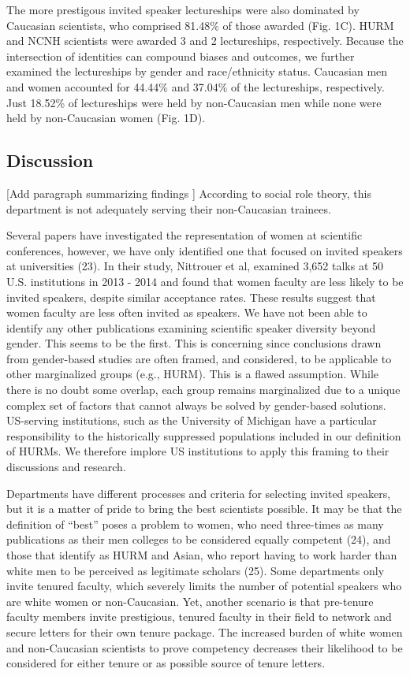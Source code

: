 \documentclass[10pt,]{article}
\begin{document}
The more prestigous invited speaker lectureships were also dominated by
Caucasian scientists, who comprised 81.48\% of those awarded (Fig. 1C).
HURM and NCNH scientists were awarded 3 and 2 lectureships,
respectively. Because the intersection of identities can compound biases
and outcomes, we further examined the lectureships by gender and
race/ethnicity status. Caucasian men and women accounted for 44.44\% and
37.04\% of the lectureships, respectively. Just 18.52\% of lectureships
were held by non-Caucasian men while none were held by non-Caucasian
women (Fig. 1D).

\subsection{Discussion}\label{discussion}

{[}Add paragraph summarizing findings {]} According to social role
theory, this department is not adequately serving their non-Caucasian
trainees.

Several papers have investigated the representation of women at
scientific conferences, however, we have only identified one that
focused on invited speakers at universities (23). In their study,
Nittrouer et al, examined 3,652 talks at 50 U.S. institutions in 2013 -
2014 and found that women faculty are less likely to be invited
speakers, despite similar acceptance rates. These results suggest that
women faculty are less often invited as speakers. We have not been able
to identify any other publications examining scientific speaker
diversity beyond gender. This seems to be the first. This is concerning
since conclusions drawn from gender-based studies are often framed, and
considered, to be applicable to other marginalized groups (e.g., HURM).
This is a flawed assumption. While there is no doubt some overlap, each
group remains marginalized due to a unique complex set of factors that
cannot always be solved by gender-based solutions. US-serving
institutions, such as the University of Michigan have a particular
responsibility to the historically suppressed populations included in
our definition of HURMs. We therefore implore US institutions to apply
this framing to their discussions and research.

Departments have different processes and criteria for selecting invited
speakers, but it is a matter of pride to bring the best scientists
possible. It may be that the definition of ``best'' poses a problem to
women, who need three-times as many publications as their men colleges
to be considered equally competent (24), and those that identify as HURM
and Asian, who report having to work harder than white men to be
perceived as legitimate scholars (25). Some departments only invite
tenured faculty, which severely limits the number of potential speakers
who are white women or non-Caucasian. Yet, another scenario is that
pre-tenure faculty members invite prestigious, tenured faculty in their
field to network and secure letters for their own tenure package. The
increased burden of white women and non-Caucasian scientists to prove
competency decreases their likelihood to be considered for either tenure
or as possible source of tenure letters.
\end{document}
